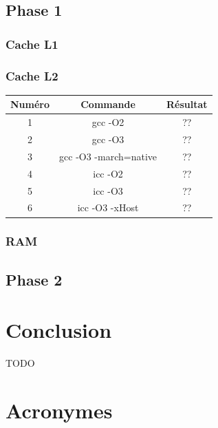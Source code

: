 \documentclass[12pt,a4paper]{article}
\begin{document}
\subsection{Phase 1}
\subsubsection{Cache L1}
\subsubsection{Cache L2}


\begin{tabular}{|c|c|c|}
  \hline
	Numéro  & Commande & Résultat\\
  \hline
  1 & gcc -O2 & ?? \\
    \hline
  2 & gcc -O3 & ?? \\
    \hline
  3 & gcc -O3 -march=native & ?? \\
    \hline
  4 & icc -O2 & ?? \\
    \hline
  5 & icc -O3 & ?? \\
    \hline
  6 & icc -O3 -xHost & ?? \\
  \hline
\end{tabular}

\subsubsection{RAM}


\subsection{Phase 2}

\section{Conclusion}

TODO


\newpage
\section*{Acronymes}

\begin{acronym}
\end{acronym}
\end{document}
